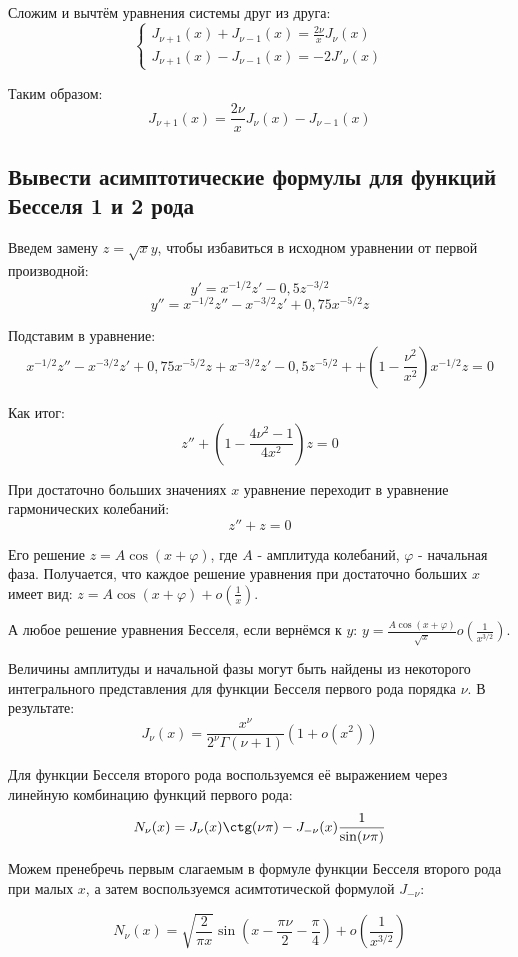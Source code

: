 \documentclass[12pt, a4paper]{report}
\begin{document}
Сложим и вычтём уравнения системы друг из друга:
\begin{equation*}
	\begin{cases}
		J_{\nu + 1}(x) + J_{\nu - 1}(x) = \frac{2\nu}{x} J_{\nu}(x) \\
		J_{\nu + 1}(x) - J_{\nu - 1}(x) = -2 J'_{\nu}(x)
	\end{cases}
\end{equation*}

Таким образом:
\[  J_{\nu + 1}(x) = \frac{2\nu}{x} J_{\nu}(x) - J_{\nu - 1}(x) \]

\subsection{Вывести асимптотические формулы для функций Бесселя 1 и 2 рода}
Введем замену $z = \sqrt{x}y$, чтобы избавиться в исходном уравнении от первой производной:
\[ y' = x^{-1/2} z' - 0,5 z^{-3/2} \]
\[ y'' = x^{-1/2} z'' - x^{-3/2}z' +0,75x^{-5/2} z\]

Подставим в уравнение:
\[ x^{-1/2} z'' - x^{-3/2}z' +0,75x^{-5/2} z + x^{-3/2}z' - 0,5 z^{-5/2} + + (1 - \frac{\nu^2}{x^2})x^{-1/2}z = 0 \]

Как итог:
\[ z'' + (1 - \frac{4\nu^2 - 1}{4x^2})z = 0\]

При достаточно больших значениях $x$ уравнение переходит в уравнение гармонических колебаний:
\[ z'' + z = 0 \]

Его решение $ z = A\cos(x + \varphi) $, где $A$ - амплитуда колебаний, $\varphi$ - начальная фаза. Получается, что каждое решение уравнения при достаточно больших $x$ имеет вид: $z = A\cos(x + \varphi) + o(\frac{1}{x})$.

А любое решение уравнения Бесселя, если вернёмся к $y$: $y = \frac{A\cos(x + \varphi)}{\sqrt{x}} o(\frac{1}{x^{3/2}})$.

Величины амплитуды и начальной фазы могут быть найдены из некоторого интегрального представления для функции Бесселя первого рода порядка $\nu$. В результате:
\[ J_{\nu} (x) = \frac{x^{\nu}}{2^{\nu} \Gamma(\nu + 1)}(1 + o(x^2)) \]

Для функции Бесселя второго рода воспользуемся её выражением через линейную комбинацию функций первого рода:
\[ N_{\nu} (x) = J_{\nu} (x) \ctg(\nu \pi) - J_{-\nu} (x) \frac{1}{\sin(\nu \pi)}\]

Можем пренебречь первым слагаемым в формуле функции Бесселя второго рода при малых $x$, а затем воспользуемся асимтотической формулой $J_{-\nu}$:

\[ N_{\nu} (x) = \sqrt{\frac{2}{\pi x}} \sin(x - \frac{\pi \nu}{2} - \frac{\pi}{4}) + o(\frac{1}{x^{3/2}}) \]
\end{document}
